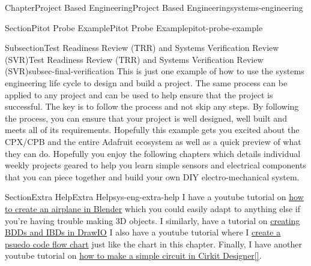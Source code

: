 \documentclass[oneside,10pt,]{book}
\newcommand{\xreffont}{\relax}
\newcommand{\linkhilite}[1]{\underline{#1}}
\numberwithin{equation}{section}
\begin{document}
\begin{chapterptx}{Chapter}{Project Based Engineering}{}{Project Based Engineering}{}{}{systems-engineering}
\begin{sectionptx}{Section}{Pitot Probe Example}{}{Pitot Probe Example}{}{}{pitot-probe-example}
\begin{subsectionptx}{Subsection}{Test Readiness Review (TRR) and Systems Verification Review (SVR)}{}{Test Readiness Review (TRR) and Systems Verification Review (SVR)}{}{}{subsec-final-verification}
This is just one example of how to use the systems engineering life cycle to design and build a project. The same process can be applied to any project and can be used to help ensure that the project is successful. The key is to follow the process and not skip any steps. By following the process, you can ensure that your project is well designed, well built and meets all of its requirements. Hopefully this example gets you excited about the CPX\slash{}CPB and the entire Adafruit ecosystem as well as a quick preview of what they can do. Hopefully you enjoy the following chapters which details individual weekly projects geared to help you learn simple sensors and electrical components that you can piece together and build your own DIY electro-mechanical system.%
\end{subsectionptx}
\end{sectionptx}
%
%
\typeout{************************************************}
\typeout{************************************************}
%
\begin{sectionptx}{Section}{Extra Help}{}{Extra Help}{}{}{sys-eng-extra-help}
I have a youtube tutorial on \href{https://www.youtube.com/watch?v=l4JhueUcw4U}{\linkhilite{how to create an airplane in Blender}} which you could easily adapt to anything else if you're having trouble making 3D objects. I similarly, have a tutorial on \href{https://youtu.be/G-vQ3v1j7ZU}{\linkhilite{creating BDDs and IBDs in DrawIO}} I also have a youtube tutorial where I \href{https://www.youtube.com/watch?v=FSF-TeceGQ8}{\linkhilite{create a psuedo code flow chart}} just like the chart in this chapter. Finally, I have another youtube tutorial on \href{https://www.youtube.com/watch?v=xZ-j7GbpLV0}{\linkhilite{how to make a simple circuit in Cirkit Designer}}\hyperlink{youtube}{\linkhilite{[{\xreffont 50}]}}.%
\end{sectionptx}
\end{chapterptx}
%
%
\typeout{************************************************}
\typeout{************************************************}
%
\end{document}
